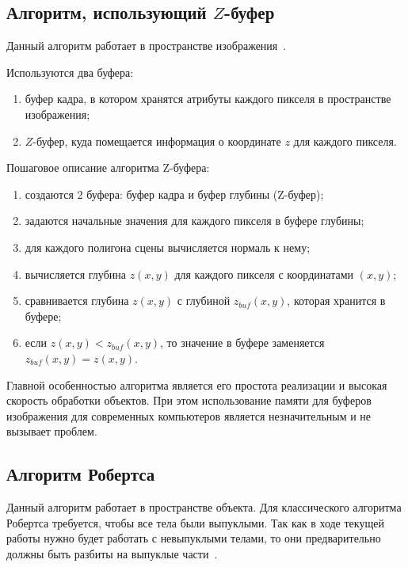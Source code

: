 \subsection{Алгоритм, использующий $Z$-буфер}

Данный алгоритм работает в пространстве изображения~\cite{roders}.

Используются два буфера:
\begin{enumerate} [label=\arabic*)]
	\item буфер кадра, в котором хранятся атрибуты каждого пикселя в пространстве изображения;
	\item $Z$-буфер, куда помещается информация о координате $z$ для каждого пикселя.
\end{enumerate}

Пошаговое описание алгоритма Z-буфера:
\begin{enumerate} [label=\arabic*)]
	\item создаются 2 буфера: буфер кадра и буфер глубины (Z-буфер);
	\item задаются начальные значения для каждого пикселя в буфере глубины;
	\item для каждого полигона сцены вычисляется нормаль к нему;
	\item вычисляется глубина $z(x, y)$ для каждого пикселя с координатами $(x, y)$;
	\item сравнивается глубина $z(x, y)$ с глубиной $z_{buf}(x, y)$, которая хранится в буфере;
	\item если $z(x, y) < z_{buf}(x, y)$, то значение в буфере заменяется $z_{buf}(x, y) = z(x, y)$.
\end{enumerate}

Главной особенностью алгоритма является его простота реализации и высокая скорость обработки объектов. При этом использование памяти для буферов изображения для современных компьютеров является незначительным и не вызывает проблем.


\subsection{Алгоритм Робертса}


Данный алгоритм работает в пространстве объекта. Для классического алгоритма Робертса требуется, чтобы все тела были выпуклыми. Так как в ходе текущей работы нужно будет работать с невыпуклыми телами, то они предварительно должны быть разбиты на выпуклые части~\cite{roders}. 

